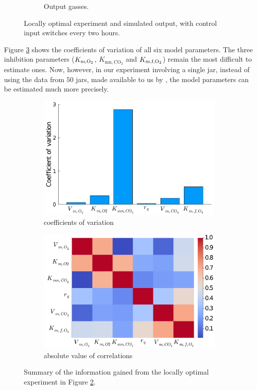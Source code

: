 \begin{figure}[H]
\begin{subfigure}{0.45\textwidth}
		\caption{Output gasses.}
		\label{figlocalc}
	\end{subfigure}
	\caption{Locally optimal experiment and simulated output, with control input switches every two hours.}
	\label{figlocal}
\end{figure}
Figure \ref{figlocald} shows the coefficients of variation of all six model parameters. The three inhibition parameters ($K_{\text{m},\text{O}_2}$, $K_{\text{mn},\text{CO}_2}$ and $K_{\text{m,f},\text{O}_2}$) remain the most difficult to estimate ones. Now, however, in our experiment involving a single jar, instead of using the data from $50$ jars, made available to us by \textcite{ho}, the model parameters can be estimated much more precisely.
\begin{figure}[H]
	\begin{subfigure}[b]{0.45\textwidth}
		\includegraphics[width=1.0\textwidth]{figure/paper 2/l12_var.pdf}
		\caption{coefficients of variation}
		\label{figlocald}
	\end{subfigure}
	\begin{subfigure}[b]{0.45\textwidth}
		\centering
		\includegraphics[width=1.0\textwidth]{figure/paper 2/l12_corr.pdf}
		\caption{absolute value of correlations}
		\label{figlocale}
	\end{subfigure}
	\caption{Summary of the information gained from the locally optimal experiment in Figure \ref{figlocal}.} 
\end{figure}
